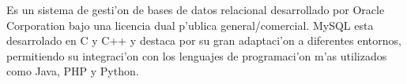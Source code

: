 Es un sistema de gesti'on de bases de datos relacional desarrollado por Oracle Corporation bajo una licencia dual p'ublica general/comercial.
MySQL esta desarrolado en C y C++ y destaca por su gran adaptaci'on a diferentes entornos, permitiendo su integraci'on con los lenguajes de programaci'on m'as utilizados como Java, PHP y Python.

